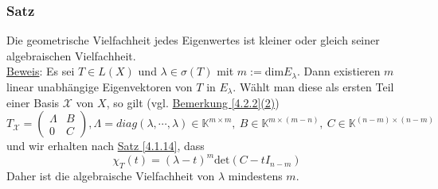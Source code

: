 \subsubsection{Satz}
Die geometrische Vielfachheit jedes Eigenwertes ist kleiner oder gleich seiner algebraischen Vielfachheit.\\
\underline{Beweis}: Es sei $T\in L(X)$ und $\lambda \in \sigma (T)$ mit $m:=$dim$E_\lambda$.  Dann existieren $m$ linear unabhängige Eigenvektoren von $T$ in $E_\lambda$.  Wählt man diese als ersten Teil einer Basis $\mathcal{X}$ von $X$, so gilt (vgl. \hyperref[4.2.2]{Bemerkung \ref{4.2.2}(2)})
\[T_\mathcal{X} =\begin{pmatrix}\Lambda & B\\ 0 & C\end{pmatrix}, \Lambda=diag(\lambda ,\cdots ,\lambda )\in\mathbb{K}^{m\times m},\ B\in\mathbb{K}^{m\times (m-n)},\ C\in\mathbb{K}^{(n-m)\times (n-m)}\]
und wir erhalten nach \hyperref[4.1.14]{Satz \ref{4.1.14}}, dass
\[\chi _T(t)=(\lambda -t)^m \mathrm{det}(C-tI_{n-m})\]
Daher ist die algebraische Vielfachheit von $\lambda$ mindestens $m$.